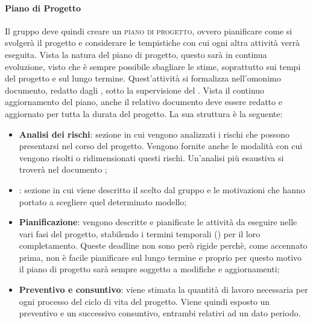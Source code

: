 \documentclass[../norme_di_progetto.tex]{subfiles}
\begin{document}
\paragraph{Piano di Progetto}
Il gruppo deve quindi creare un \textsc{piano di progetto}, ovvero pianificare come si svolgerà il progetto e considerare le tempistiche con cui ogni altra attività verrà eseguita. Vista la natura del piano di progetto, questo sarà in continua evoluzione, visto che è sempre possibile sbagliare le stime, soprattutto sui tempi del progetto e sul lungo termine. Quest'attività si formalizza nell'omonimo documento, redatto dagli \emph{}, sotto la supervisione del . Vista il continuo aggiornamento del piano, anche il relativo documento deve essere redatto e aggiornato per tutta la durata del progetto. La sua struttura è la seguente:
\begin{itemize}
    \item \textbf{Analisi dei rischi}: sezione in cui vengono analizzati i rischi che possono presentarsi nel corso del progetto. Vengono fornite anche le modalità con cui vengono risolti o ridimensionati questi rischi. Un'analisi più esaustiva si troverà nel documento ;
    \item {}: sezione in cui viene descritto il  scelto dal gruppo e le motivazioni che hanno portato a scegliere quel determinato modello;
    \item \textbf{Pianificazione}: vengono descritte e pianificate le attività da eseguire nelle vari fasi del progetto, stabilendo i termini temporali () per il loro completamento. Queste deadline non sono però rigide perchè, come accennato prima, non è facile pianificare sul lungo termine e proprio per questo motivo il piano di progetto sarà sempre soggetto a modifiche e aggiornamenti;
    \item \textbf{Preventivo e consuntivo}: viene stimata la quantità di lavoro necessaria per ogni processo del ciclo di vita del progetto. Viene quindi esposto un preventivo e un successivo consuntivo, entrambi relativi ad un dato periodo.
\end{itemize}
\end{document}
